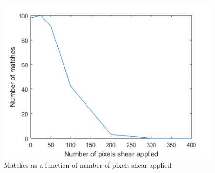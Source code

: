 \documentclass{article}
\begin{document}
\begin{figure}[H]
 \centering
 \includegraphics[width=.7\textwidth]{graph.png}
 \caption{Matches as a function of number of pixels shear applied.}
 \label{fig4}
\end{figure}

\end{document}
